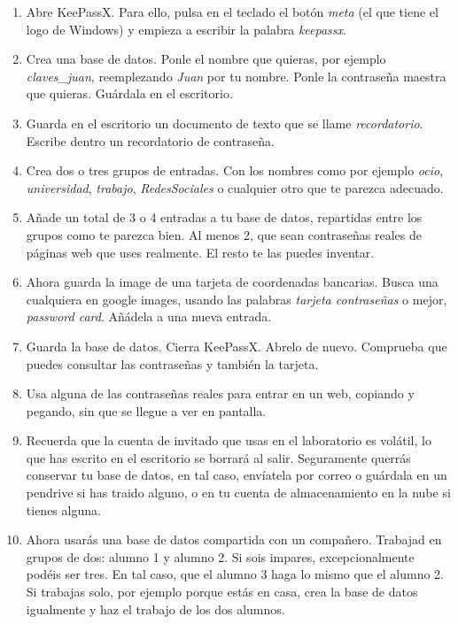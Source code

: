 \documentclass[a4paper,12pt]{article}
\begin{document}
    \begin{enumerate}
    \item
Abre KeePassX. Para ello, pulsa en el teclado el botón \emph{meta} (el que tiene
el logo de Windows) y empieza a escribir la palabra \emph{keepassx}.

    \item
Crea una base de datos. Ponle el nombre que quieras, por ejemplo \emph{claves\_juan},
reemplezando \emph{Juan} por tu nombre. Ponle la contraseña maestra que quieras. Guárdala en el escritorio.

    \item
Guarda en el escritorio un documento de texto que se llame \emph{recordatorio}. Escribe dentro
un recordatorio de contraseña.

    \item
Crea dos o tres grupos de entradas. Con los nombres como por ejemplo \emph{ocio},  
\emph{universidad}, \emph{trabajo}, \emph{RedesSociales} o cualquier otro que te parezca 
adecuado.

    \item
Añade un total de 3 o 4 entradas a tu base de datos, repartidas entre los grupos
como te parezca bien. Al menos 2, que sean contraseñas reales de páginas web que 
uses realmente. El resto te las puedes inventar.

    \item
Ahora guarda la image de una tarjeta de coordenadas bancarias. Busca una cualquiera en google images,
usando las palabras \emph{tarjeta contraseñas} o mejor, \emph{password card}. 
Añádela a una nueva entrada.

    \item
Guarda la base de datos. Cierra KeePassX. Abrelo de nuevo. Comprueba que puedes
consultar las contraseñas y también la tarjeta.

    \item
Usa alguna de las contraseñas reales para entrar en un web, copiando y pegando,
sin que se llegue a ver en pantalla.

    \item
Recuerda que la cuenta de invitado que usas en el laboratorio es volátil, lo que has escrito
en el escritorio se borrará al salir. Seguramente querrás conservar tu base
de datos, en tal caso, envíatela por correo o guárdala en un pendrive si
has traido alguno, o en tu cuenta de almacenamiento en la nube si tienes alguna.


    \item
Ahora usarás una base de datos compartida con un compañero. Trabajad en grupos
de dos: alumno 1 y alumno 2. Si sois impares, excepcionalmente podéis ser tres.
En tal caso, que el alumno 3 haga lo mismo que el alumno 2. Si trabajas
solo, por ejemplo porque estás en casa, crea la base de datos igualmente y haz
el trabajo de los dos alumnos.


\end{enumerate}
\end{document}
